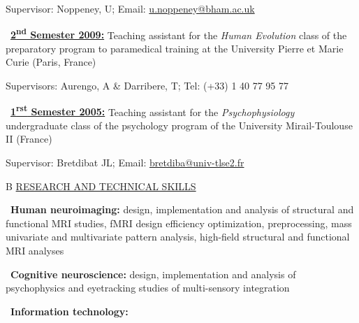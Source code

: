 \documentclass[a4paper,12pt,oneside]{letter}
\begin{document}
{Supervisor: Noppeney, U; Email: \href{mailto:u.noppeney@bham.ac.uk}{u.noppeney@bham.ac.uk}

\textbullet~\underline{\textbf{2\textsuperscript{nd} Semester 2009:}} 	Teaching assistant for the \textit{Human Evolution} class of the preparatory program to paramedical training at the University Pierre et Marie Curie (Paris, France)

Supervisors: Aurengo, A \& Darribere, T; Tel: (+33) 1 40 77 95 77

\textbullet~\underline{\textbf{1\textsuperscript{rst} Semester 2005:}} 	Teaching assistant for the \textit{Psychophysiology} undergraduate class of the psychology program of the University Mirail-Toulouse II (France)

Supervisor: Bretdibat JL; Email: \href{mailto:bretdiba@univ-tlse2.fr}{bretdiba@univ-tlse2.fr}


\medskip 

\begin{tabular}{B}
 \underline{RESEARCH AND TECHNICAL SKILLS}
\end{tabular}


\textbullet~\textbf{Human neuroimaging:} design, implementation and analysis of structural and functional MRI studies, fMRI design efficiency optimization, preprocessing, mass univariate and multivariate pattern analysis, high-field structural and functional MRI analyses

\textbullet~\textbf{Cognitive neuroscience:} design, implementation and analysis of psychophysics and eyetracking studies of multi-sensory integration 



\textbullet~\textbf{Information technology:}

}
\end{document}

